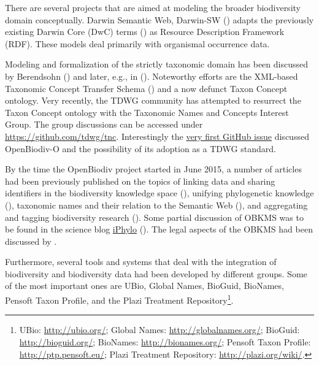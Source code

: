 There are several projects that are aimed at modeling the broader biodiversity domain conceptually. Darwin Semantic Web, Darwin-SW (\cite{baskauf_darwin-sw:_2016}) adapts the previously existing Darwin Core (DwC) terms (\cite{wieczorek_darwin_2012}) as Resource Description Framework (RDF). These models deal primarily with organismal occurrence data.

Modeling and formalization of the strictly taxonomic domain has been discussed by Berendsohn (\cite{berendsohn_concept_1995}) and later, e.g., in (\cite{franz_perspectives:_2009,sterner_taxonomy_2017}). Noteworthy efforts are the XML-based Taxonomic Concept Transfer Schema (\cite{taxonomic_names_and_concepts_interest_group_taxonomic_2006}) and a now defunct Taxon Concept ontology. Very recently, the TDWG community has attempted to resurrect the Taxon Concept ontology with the Taxonomic Names and Concepts Interest Group. The group discussions can be accessed under \url{https://github.com/tdwg/tnc}. Interestingly the \href{https://github.com/tdwg/tnc/issues/1}{very first GitHub issue} discussed OpenBiodiv-O and the possibility of its adoption as a TDWG standard.

By the time the OpenBiodiv project started in June 2015, a number of articles had been previously published on the topics of linking data and sharing identifiers in the biodiversity knowledge space (\cite{page_biodiversity_2008}), unifying phylogenetic knowledge (\cite{parr_evolutionary_2012}), taxonomic names and their relation to the Semantic Web (\cite{page_taxonomic_2006,patterson_names_2010}), and aggregating and tagging biodiversity research (\cite{mindell_aggregating_2011}). Some partial discussion of OBKMS was to be found in the science blog \href{http://iphylo.blogspot.bg}{iPhylo} (\cite{page_vision_2014, page_putting_2015}). The legal aspects of the OBKMS had been discussed by \cite{egloff_open_2014}.

Furthermore, several tools and systems that deal with the integration of biodiversity and biodiversity data had been developed by different groups. Some of the most important ones are UBio, Global Names, BioGuid, BioNames, Pensoft Taxon Profile, and the Plazi Treatment Repository\footnote{UBio: \href{http://ubio.org/}{http://ubio.org/}; Global Names: \href{http://globalnames.org/}{http://globalnames.org/}; BioGuid: \href{http://bioguid.org/}{http://bioguid.org/}; BioNames: \href{http://bionames.org/}{http://bionames.org/}; Pensoft Taxon Profile: \href{http://ptp.pensoft.eu/}{http://ptp.pensoft.eu/}; Plazi Treatment Repository: \href{http://plazi.org/wiki/}{http://plazi.org/wiki/}.}.

